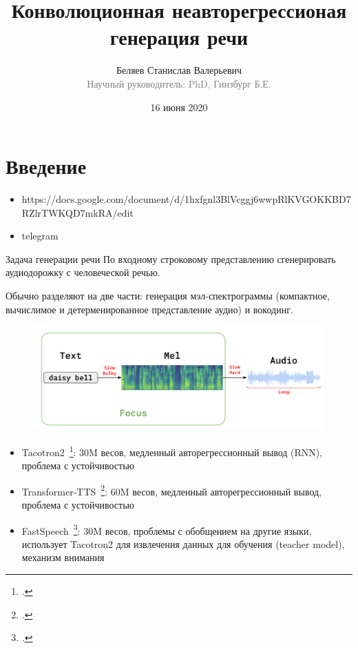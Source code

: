 

\title[Генерация речи]{Конволюционная неавторегрессионая генерация речи}
\author[Беляев Станислав]{Беляев Станислав Валерьевич\\\footnotesize\textcolor{gray}{Научный руководитель: PhD, Гинзбург Б.Е.}{}}
\date{16 июня 2020}



\begin{frame}
\titlepage
\end{frame}

\section{Введение}

\begin{frame}
\begin{itemize}
    \item https://docs.google.com/document/d/1hxfgnl3BlVcggj6wwpRlKVGOKKBD7RZlrTWKQD7mkRA/edit
    \item telegram
\end{itemize}
\begin{block}{Задача генерации речи}
    По входному строковому представлению сгенерировать аудиодорожку с человеческой речью.
\end{block}
Обычно разделяют на две части: генерация мэл-спектрограммы (компактное, вычислимое и детерменированное представление аудио) и вокодинг.
\begin{figure}[H]
\centering
\includegraphics[width=1.0\textwidth]{images/tts-pipeline.png}
\end{figure}
\end{frame}

\begin{frame}
\begin{itemize}
    \item Tacotron2~\footcite{tacotron2}: 30M весов, медленный авторегрессионный вывод (RNN), проблема с устойчивостью
    \item Transformer-TTS~\footcite{transformer-tts}: 60M весов, медленный авторегрессионный вывод, проблема с устойчивостью
    \item FastSpeech~\footcite{fastspeech}: 30M весов, проблемы с обобщением на другие языки, использует Tacotron2 для извлечения данных для обучения (teacher model), механизм внимания
\end{itemize}
\end{frame}

